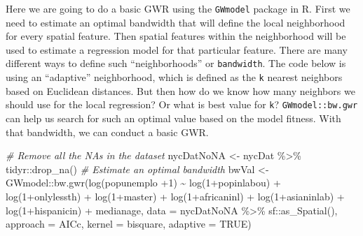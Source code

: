 \documentclass[
  11pt,
]{book}
\newenvironment{Shaded}{\begin{snugshade}}{\end{snugshade}}
\newcommand{\AttributeTok}[1]{\textcolor[rgb]{0.77,0.63,0.00}{#1}}
\newcommand{\CommentTok}[1]{\textcolor[rgb]{0.56,0.35,0.01}{\textit{#1}}}
\newcommand{\ConstantTok}[1]{\textcolor[rgb]{0.00,0.00,0.00}{#1}}
\newcommand{\DecValTok}[1]{\textcolor[rgb]{0.00,0.00,0.81}{#1}}
\newcommand{\FunctionTok}[1]{\textcolor[rgb]{0.00,0.00,0.00}{#1}}
\newcommand{\NormalTok}[1]{#1}
\newcommand{\OtherTok}[1]{\textcolor[rgb]{0.56,0.35,0.01}{#1}}
\newcommand{\SpecialCharTok}[1]{\textcolor[rgb]{0.00,0.00,0.00}{#1}}
\newcommand{\StringTok}[1]{\textcolor[rgb]{0.31,0.60,0.02}{#1}}
\begin{document}
Here we are going to do a basic GWR using the \texttt{GWmodel} package in R. First we need to estimate an optimal bandwidth that will define the local neighborhood for every spatial feature. Then spatial features within the neighborhood will be used to estimate a regression model for that particular feature. There are many different ways to define such ``neighborhoods'' or \texttt{bandwidth}. The code below is using an ``adaptive'' neighborhood, which is defined as the \texttt{k} nearest neighbors based on Euclidean distances. But then how do we know how many neighbors we should use for the local regression? Or what is best value for \texttt{k}? \texttt{GWmodel::bw.gwr} can help us search for such an optimal value based on the model fitness. With that bandwidth, we can conduct a basic GWR.

\begin{Shaded}
\begin{Highlighting}[]
\CommentTok{\# Remove all the NAs in the dataset}
\NormalTok{nycDatNoNA }\OtherTok{\textless{}{-}}\NormalTok{ nycDat }\SpecialCharTok{\%\textgreater{}\%}\NormalTok{ tidyr}\SpecialCharTok{::}\FunctionTok{drop\_na}\NormalTok{()}
\CommentTok{\# Estimate an optimal bandwidth}
\NormalTok{bwVal }\OtherTok{\textless{}{-}}\NormalTok{ GWmodel}\SpecialCharTok{::}\FunctionTok{bw.gwr}\NormalTok{(}\FunctionTok{log}\NormalTok{(popunemplo }\SpecialCharTok{+}\DecValTok{1}\NormalTok{) }\SpecialCharTok{\textasciitilde{}} \FunctionTok{log}\NormalTok{(}\DecValTok{1}\SpecialCharTok{+}\NormalTok{popinlabou) }\SpecialCharTok{+}
                           \FunctionTok{log}\NormalTok{(}\DecValTok{1}\SpecialCharTok{+}\NormalTok{onlylessth) }\SpecialCharTok{+} \FunctionTok{log}\NormalTok{(}\DecValTok{1}\SpecialCharTok{+}\NormalTok{master) }\SpecialCharTok{+} 
                           \FunctionTok{log}\NormalTok{(}\DecValTok{1}\SpecialCharTok{+}\NormalTok{africaninl) }\SpecialCharTok{+} \FunctionTok{log}\NormalTok{(}\DecValTok{1}\SpecialCharTok{+}\NormalTok{asianinlab) }\SpecialCharTok{+} 
                           \FunctionTok{log}\NormalTok{(}\DecValTok{1}\SpecialCharTok{+}\NormalTok{hispanicin) }\SpecialCharTok{+}\NormalTok{ medianage,}
                         \AttributeTok{data =}\NormalTok{ nycDatNoNA }\SpecialCharTok{\%\textgreater{}\%}\NormalTok{ sf}\SpecialCharTok{::}\FunctionTok{as\_Spatial}\NormalTok{(), }
                         \AttributeTok{approach =} \StringTok{\textquotesingle{}AICc\textquotesingle{}}\NormalTok{, }\AttributeTok{kernel =} \StringTok{\textquotesingle{}bisquare\textquotesingle{}}\NormalTok{, }
                         \AttributeTok{adaptive =} \ConstantTok{TRUE}\NormalTok{)}
\end{Highlighting}
\end{Shaded}
\end{document}
